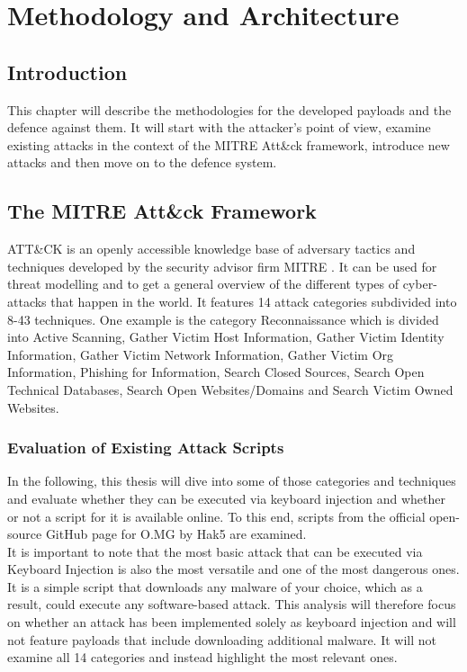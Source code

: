 \chapter{Methodology and Architecture} \label{Methodology}

\section{Introduction}

This chapter will describe the methodologies for the developed payloads and the defence against them. It will start with the attacker's point of view, examine existing attacks in the context of the MITRE Att\&ck framework, introduce new attacks and then move on to the defence system.


\section{The MITRE Att\&ck Framework}

ATT\&CK \cite{MITREATTCK} is an openly accessible knowledge base of adversary tactics and techniques developed by the security advisor firm MITRE \cite{WhoWeAre}. It can be used for threat modelling and to get a general overview of the different types of cyber-attacks that happen in the world.
It features 14 attack categories subdivided into 8-43 techniques. One example is the category Reconnaissance which is divided into Active Scanning, Gather Victim Host Information, Gather Victim Identity Information, Gather Victim Network Information, Gather Victim Org Information, Phishing for Information, Search Closed Sources, Search Open Technical Databases, Search Open Websites/Domains and Search Victim Owned Websites. 



\subsection{Evaluation of Existing Attack Scripts}

In the following, this thesis will dive into some of those categories and techniques and evaluate whether they can be executed via keyboard injection and whether or not a script for it is available online. To this end, scripts from the official open-source GitHub page for O.MG \cite{Hak5Omgpayloads2024} by Hak5 are examined. \\
It is important to note that the most basic attack that can be executed via Keyboard Injection is also the most versatile and one of the most dangerous ones. It is a simple script that downloads any malware of your choice, which as a result, could execute any software-based attack.  
This analysis will therefore focus on whether an attack has been implemented solely as keyboard injection and will not feature payloads that include downloading additional malware. It will not examine all 14 categories and instead highlight the most relevant ones. 

